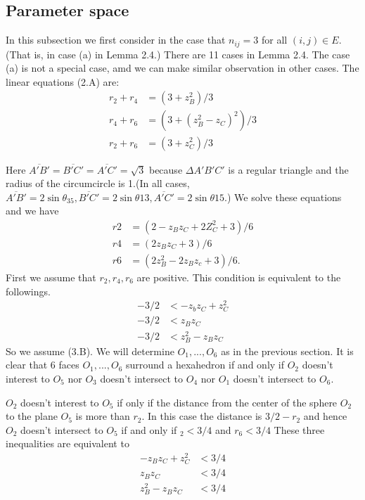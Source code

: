 \documentclass[dvipdfmx]{interact}
\theoremstyle{plain}%
\theoremstyle{definition}
\theoremstyle{remark}
\theoremstyle{problemstyle}
\begin{document}
\subsection{Parameter space}
In this subsection we first consider in the case that $n_{ij} = 3$ for all
$(i, j) \in E$. (That is, in case (a) in Lemma 2.4.) There are 11 cases
in Lemma 2.4. The case (a) is not a special case, amd we can make
similar observation in other cases.
The linear equations (2.A) are:
\begin{align*}
 r_2 + r_4 &= (3 + z_B^2) / 3 \\
 r_4 + r_6 &= (3 + (z_B^2 - z_C)^2 ) / 3 \\
 r_2 + r_6 &= (3 + z_C^2) / 3
\end{align*}

Here $\overline{A'B'} = \overline{B'C'} = \overline{A'C'} = \sqrt{3}$
because $\Delta{A'B'C'}$ is a regular triangle and the radius of the
circumcircle is 1.(In all cases, $\overline{A'B'} = 2\sin\theta_{35},
\overline{B'C'} = 2\sin\theta{13}, \overline{A'C'} = 2\sin\theta{15}$.)
We solve these equations and we have 
\begin{align}
 r2 &= (2-z_Bz_C + 2Z^2_C + 3) / 6 \\
 r4 &= (2z_Bz_C + 3) / 6 \\
 r6 &= (2z^2_B - 2z_Bz_c + 3) / 6.
\end{align}
First we assume that $r_2, r_4, r_6$ are positive. This condition is
equivalent to the followings.
\begin{align}
 -3 / 2 &< -z_bz_C + z^2_C\\
 -3 / 2 &< z_Bz_C \\
 -3 / 2 &< z^2_B - z_Bz_C
\end{align}
So we assume (3.B). We will determine $O_1, ... , O_6$ as in the
previous section. It is clear that 6 faces $O_1, ... , O_6$ surround
a hexahedron if and only if $O_2$ doesn't interest to $O_5$ nor $O_3$
doesn't intersect to $O_4$ nor $O_1$ doesn't intersect to $O_6$.

$O_2$ doesn't interest to $O_5$ if only if the distance from the center
of the sphere $O_2$ to the plane $O_5$ is more than $r_2$. In this case
the distance is $3 / 2 - r_2$ and hence $O_2$ doesn't intersect to $O_5$
if and only if $_2 < 3/4$ and $r_6 < 3 / 4$ These three inequalities are
equivalent to
\begin{align}
 -z_Bz_C + z^2_C &< 3 / 4\\
 z_Bz_C &< 3 / 4 \\
 z^2_B - z_B z_C &< 3/ 4
\end{align}
\end{document}
